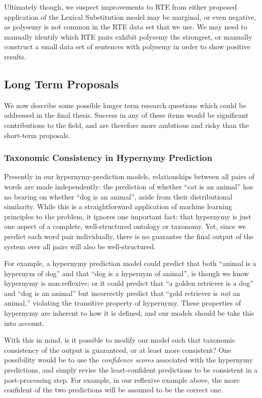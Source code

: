 \documentclass[letterpaper]{article}
\begin{document}
Ultimately though, we suspect improvements to RTE from either proposed
application of the Lexical Substitution model may be marginal, or even
negative, as polysemy is not common in the RTE data set that we use. We may
need to manually identify which RTE pairs exhibit polysemy the strongest, or
manually construct a small data set of sentences with polysemy in order to
show positive results.

\subsection{Long Term Proposals}

We now describe some possible longer term research questions which could be
addressed in the final thesis. Success in any of these items would
be significant contributions to the field, and are therefore more ambitious and
risky than the short-term proposals.

\subsubsection{Taxonomic Consistency in Hypernymy Prediction}

Presently in our hypernymy-prediction models, relationships between all
pairs of words are made independently: the prediction of whether ``cat is an
animal'' has no bearing on whether ``dog is an animal'', aside from their
distributional similarity. While this is a straightforward application of
machine learning principles to the problem, it ignores one important fact: that
hypernymy is just one aspect of a complete, well-structured ontology or
taxonomy. Yet, since we predict each word pair individually, there is no
guarantee the final output of the system over all pairs will also be
well-structured.

For example, a hypernymy prediction model could predict that both ``animal is a
hypernym of dog'' and that ``dog is a hypernym of animal'', is though we know
hypernymy is non-reflexive; or it could predict that ``a golden retriever is a
dog'' and ``dog is an animal'' but incorrectly predict that ``gold retriever is
{\em not} an animal,'' violating the transitive property of hypernymy. These
properties of hypernymy are inherent to how it is defined, and our models
should be take this into account.

With this in mind, is it possible to modify our model such that taxonomic
consistency of the output is guaranteed, or at least more consistent? One
possibility would be to use the {\em confidence scores} associated with the
hypernymy predictions, and simply revise the least-confident predictions to
be consistent in a post-processing step. For example, in our reflexive example
above, the more confident of the two predictions will be assumed to be
the correct one.
\end{document}
